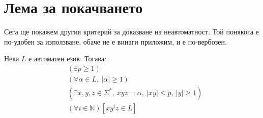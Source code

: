 \section{Лема за покачването}

Сега ще покажем другия критерий за доказване на неавтоматност.
Той понякога е по-удобен за използване, обаче не е винаги приложим, и е по-вербозен.

\begin{lemma}
    Нека $L$ е автоматен език. Тогава:
    \begin{align*}
         & (\exists p \geq 1)                                                             \\
         & (\forall \alpha \in L, \: |\alpha| \geq 1)                                     \\
         & (\exists x, y, z \in \Sigma^*, \: xyz = \alpha, \: |xy| \leq p, \: |y| \geq 1) \\
         & (\forall i \in \mathbb{N}) [xy^iz \in L]
    \end{align*}
\end{lemma}

